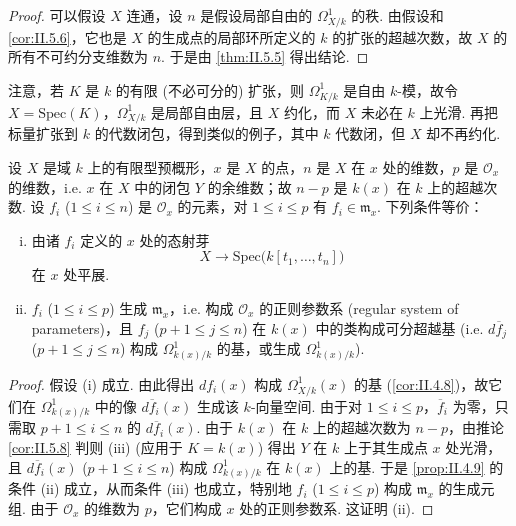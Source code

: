 \begin{proof}
可以假设 $X$ 连通，设 $n$ 是假设局部自由的 $\varOmega_{X/k}^{1}$ 的秩. 由假设和 \ref{cor:II.5.6}，它也是 $X$ 的生成点的局部环所定义的 $k$ 的扩张的超越次数，故 $X$ 的所有不可约分支维数为 $n$. 于是由 \ref{thm:II.5.5} 得出结论.
\end{proof}

注意，若 $K$ 是 $k$ 的有限 (不必可分的) 扩张，则 $\varOmega_{K/k}^{1}$ 是自由 $k$-模，故令 $X = \mathrm{Spec}(K)$，$\varOmega_{X/k}^{1}$ 是局部自由层，且 $X$ 约化，而 $X$ 未必在 $k$ 上光滑. 再把标量扩张到 $k$ 的代数闭包，得到类似的例子，其中 $k$ 代数闭，但 $X$ 却不再约化.

\begin{corollary}\label{cor:II.5.8}
设 $X$ 是域 $k$ 上的有限型预概形，$x$ 是 $X$ 的点，$n$ 是 $X$ 在 $x$ 处的维数，$p$ 是 $\mathcal{O}_x$ 的维数，i.e. $x$ 在 $X$ 中的闭包 $Y$ 的余维数；故 $n - p$ 是 $k(x)$ 在 $k$ 上的超越次数. 设 $f_i$ ($1 \leqslant i \leqslant n$) 是 $\mathcal{O}_x$ 的元素，对 $1 \leqslant i \leqslant p$ 有 $f_i \in \mathfrak{m}_x$. 下列条件等价：
\begin{enumerate}[(i)]
\item 由诸 $f_i$ 定义的 $x$ 处的态射芽
\[
X \longrightarrow \mathrm{Spec}\bigl(k[t_1, \dots, t_n]\bigr)
\]
在 $x$ 处平展.
\item $f_i$ ($1 \leqslant i \leqslant p$) 生成 $\mathfrak{m}_x$，i.e. 构成 $\mathcal{O}_x$ 的正则参数系 (regular system of parameters)，且 $f_j$ ($p+1 \leqslant j \leqslant n$) 在 $k(x)$ 中的类构成可分超越基 (i.e. $d\overline{f}_j$ ($p+1 \leqslant j \leqslant n$) 构成 $\varOmega_{k(x)/k}^{1}$ 的基，或生成 $\varOmega_{k(x)/k}^{1}$).
\end{enumerate}
\end{corollary}

\begin{proof}
假设 (i) 成立. 由此得出 $df_i(x)$ 构成 $\varOmega_{X/k}^{1}(x)$ 的基 (\cref{cor:II.4.8})，故它们在 $\varOmega_{k(x)/k}^{1}$ 中的像 $d\overline{f}_i(x)$ 生成该 $k$-向量空间. 由于对 $1 \leqslant i \leqslant p$，$\overline{f}_i$ 为零，只需取 $p+1 \leqslant i \leqslant n$ 的 $d\overline{f}_i(x)$. 由于 $k(x)$ 在 $k$ 上的超越次数为 $n - p$，由推论 \ref{cor:II.5.8} 判则 (iii) (应用于 $K = k(x)$) 得出 $Y$ 在 $k$ 上于其生成点 $x$ 处光滑，且 $d\overline{f}_i(x)$ ($p+1 \leqslant i \leqslant n$) 构成 $\varOmega_{k(x)/k}^{1}$ 在 $k(x)$ 上的基. 于是 \ref{prop:II.4.9} 的条件 (ii) 成立，从而条件 (iii) 也成立，特别地 $f_i$ ($1 \leqslant i \leqslant p$) 构成 $\mathfrak{m}_x$ 的生成元组. 由于 $\mathcal{O}_x$ 的维数为 $p$，它们构成 $x$ 处的正则参数系. 这证明 (ii).
\end{proof}


